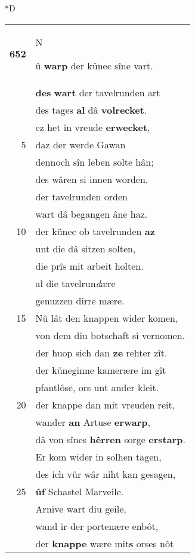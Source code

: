 \documentclass[8pt,a4paper,notitlepage]{article}
\begin{document}
\begin{table}[ht]
\begin{minipage}[t]{0.5\linewidth}
\small
\begin{center}*D
\end{center}
\begin{tabular}{rl}
\textbf{652} & \begin{large}N\end{large}û \textbf{warp} der künec sîne vart.\\ 
 & \textbf{des} \textbf{wart} der tavelrunden art\\ 
 & des tages \textbf{al} dâ \textbf{volrecket}.\\ 
 & ez het in vreude \textbf{erwecket},\\ 
5 & daz der werde Gawan\\ 
 & dennoch sîn leben solte hân;\\ 
 & des wâren si innen worden.\\ 
 & der tavelrunden orden\\ 
 & wart dâ begangen âne haz.\\ 
10 & der künec ob tavelrunden \textbf{az}\\ 
 & unt die dâ sitzen solten,\\ 
 & die prîs mit arbeit holten.\\ 
 & al die tavelrun\textit{d}ære\\ 
 & genuzzen dirre mære.\\ 
15 & Nû lât den knappen wider komen,\\ 
 & von dem diu botschaft sî vernomen.\\ 
 & der huop sich dan \textbf{ze} rehter zît.\\ 
 & der küneginne kamerære im gît\\ 
 & pfantlôse, ors unt ander kleit.\\ 
20 & der knappe dan mit vreuden reit,\\ 
 & wander \textbf{an} Artuse \textbf{erwarp},\\ 
 & dâ von sînes \textbf{hêrren} sorge \textbf{erstarp}.\\ 
 & Er kom wider in solhen tagen,\\ 
 & des ich vür wâr niht kan gesagen,\\ 
25 & \textbf{ûf} Schastel Marveile.\\ 
 & Arnive wart diu geile,\\ 
 & wand ir der portenære enbôt,\\ 
 & der \textbf{knappe} wære mit\textbf{s} orses nôt\\ 

\end{tabular}
\end{minipage}
\end{table}
\end{document}
